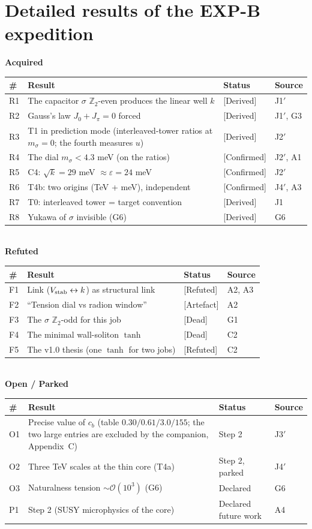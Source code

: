 \section{Detailed results of the EXP-B expedition}
\begin{center}\small
\textbf{Acquired}\\[2pt]
\begin{tabular}{llll}\toprule
\# & Result & Status & Source\\\midrule
R1 & The capacitor $\sigma$ $\mathbb{Z}_2$-even produces the linear well $k$ & [Derived] & J1$'$\\
R2 & Gauss's law $J_{0}+J_{\pi}=0$ forced & [Derived] & J1$'$, G3\\
R3 & T1 in prediction mode (interleaved-tower ratios at $m_\sigma=0$; the fourth measures $u$) & [Derived] & J2$'$\\
R4 & The dial $m_\sigma<4.3$ meV (on the ratios) & [Confirmed] & J2$'$, A1\\
R5 & C4: $\sqrt{k}=29$ meV $\approx\varepsilon=24$ meV & [Confirmed] & J2$'$\\
R6 & T4b: two origins (TeV + meV), independent & [Confirmed] & J4$'$, A3\\
R7 & T0: interleaved tower = target convention & [Derived] & J1\\
R8 & Yukawa of $\sigma$ invisible (G6) & [Derived] & G6\\\bottomrule
\end{tabular}\\[8pt]
\textbf{Refuted}\\[2pt]
\begin{tabular}{llll}\toprule
\# & Result & Status & Source\\\midrule
F1 & Link ($V_{\rm stab}\leftrightarrow k$) as structural link & [Refuted] & A2, A3\\
F2 & ``Tension dial vs radion window'' & [Artefact] & A2\\
F3 & The $\sigma$ $\mathbb{Z}_2$-odd for this job & [Dead] & G1\\
F4 & The minimal wall-soliton $\tanh$ & [Dead] & C2\\
F5 & The v1.0 thesis (one $\tanh$ for two jobs) & [Refuted] & C2\\\bottomrule
\end{tabular}\\[8pt]
\textbf{Open / Parked}\\[2pt]
\begin{tabular}{llll}\toprule
\# & Result & Status & Source\\\midrule
O1 & Precise value of $c_{b}$ (table $0.30/0.61/3.0/155$; the two large entries are excluded by the companion, Appendix~C) & Step 2 & J3$'$\\
O2 & Three TeV scales at the thin core (T4a) & Step 2, parked & J4$'$\\
O3 & Naturalness tension $\sim\mathcal{O}(10^{3})$ (G6) & Declared & G6\\
P1 & Step 2 (SUSY microphysics of the core) & Declared future work & A4\\\bottomrule
\end{tabular}
\end{center}


